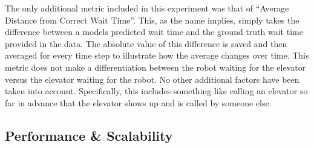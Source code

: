 The only additional metric included in this experiment was that of ``Average
Distance from Correct Wait Time''. This, as the name implies, simply takes the
difference between a models predicted wait time and the ground truth wait time
provided in the data. The absolute value of this difference is saved and then
averaged for every time step to illustrate how the average changes over time. This
metric does not make a differentiation between the robot waiting for the
elevator versus the elevator waiting for the robot. No other additional
factors have been taken into account. Specifically, this includes something like calling an
elevator so far in advance that the elevator shows up and is called by someone else. \\

\subsection{ Performance \& Scalability }

\begin{table}[h!]
  \centering
  \caption{Elevator Wait Time Overview}
  \label{table:Elevator_Wait_Time_Overview}
\end{table}


\begin{table}[h!]
  \centering
  \caption{High Resolution Elevator Wait Time Overview}
  \label{table:High_Resolution_Elevator_Wait_Time_Overview}
\end{table}

